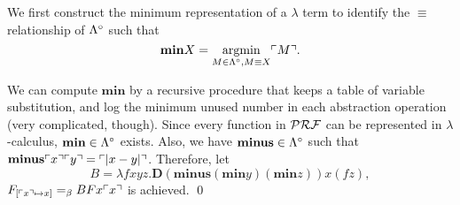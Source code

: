 \begin{pf} \rm
 We first construct the minimum representation of a $\lambda$ term to identify the
 $\equiv$ relationship of $\Lambda^\circ$ such that
\[
 \mathbf{min} X =\mathop{\mathrm{argmin}}_{M\in\Lambda^\circ, M\equiv X} \ulcorner{M}\urcorner.
\]

 We can compute $\mathbf{min}$ by a recursive procedure that keeps a table of variable substitution,
 and log the minimum unused number in each abstraction operation (very complicated, though).
 Since every function in $\mathcal{PRF}$ can be represented in $\lambda$-calculus,
 $\mathbf{min}\in\Lambda^\circ$ exists.
 Also, we have $\mathbf{minus}\in\Lambda^\circ$ such that 
 $\mathbf{minus}\ulcorner{x}\urcorner\ulcorner{y}\urcorner = 
 \ulcorner{|x-y|}\urcorner$. Therefore, let
\[
 B = \lambda fxyz. \mathbf{D}(\mathbf{minus} (\mathbf{min}y) (\mathbf{min}z))x(fz),
\]
$F_{[\ulcorner{x}\urcorner\mapsto x]} =_{\beta} BFx\ulcorner{x}\urcorner$
is achieved. 
\qed
\end{pf}
